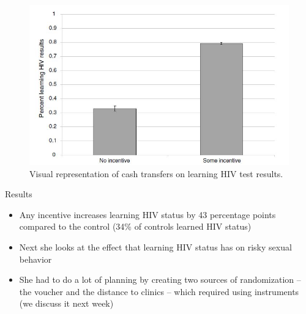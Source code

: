\documentclass{beamer}
\begin{document}
\begin{frame}[plain]

  \begin{figure}[htb]\centering
    \includegraphics[scale=0.5]{./lecture_includes/FigA.jpg}
    \caption{Visual representation of cash transfers on learning HIV test results.}
    \label{fig:thorntonfig}
  \end{figure}

\end{frame}


\begin{frame}{Results}

  \begin{itemize}
    \item Any incentive increases learning HIV status by 43 percentage points compared to the control (34\% of controls learned HIV status)
    \item Next she looks at the effect that learning HIV status has on risky sexual behavior 
    \item She had to do a lot of planning by creating two sources of randomization -- the voucher and the distance to clinics -- which required using instruments (we discuss it next week)
  \end{itemize}

\end{frame}
\end{document}
